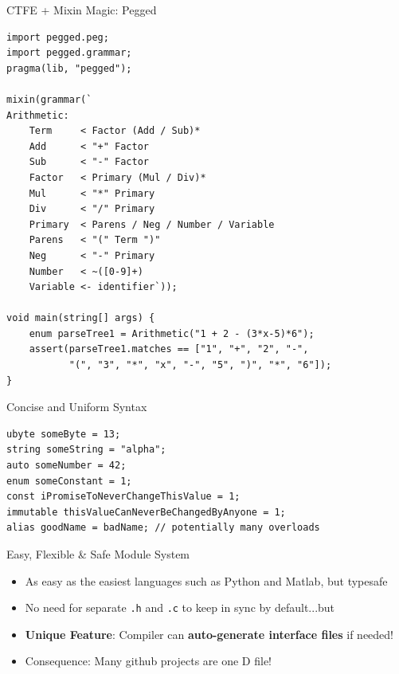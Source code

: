 \documentclass[xcolor=dvipsnames]{beamer}
\begin{document}
\begin{frame}[fragile]{CTFE + Mixin Magic: Pegged}
\footnotesize
\begin{lstlisting}[frame=single]
import pegged.peg;
import pegged.grammar;
pragma(lib, "pegged");

mixin(grammar(`
Arithmetic:
    Term     < Factor (Add / Sub)*
    Add      < "+" Factor
    Sub      < "-" Factor
    Factor   < Primary (Mul / Div)*
    Mul      < "*" Primary
    Div      < "/" Primary
    Primary  < Parens / Neg / Number / Variable
    Parens   < "(" Term ")"
    Neg      < "-" Primary
    Number   < ~([0-9]+)
    Variable <- identifier`));

void main(string[] args) {
    enum parseTree1 = Arithmetic("1 + 2 - (3*x-5)*6");
    assert(parseTree1.matches == ["1", "+", "2", "-",
           "(", "3", "*", "x", "-", "5", ")", "*", "6"]);
}
\end{lstlisting}
\end{frame}

\begin{frame}[fragile]{Concise and Uniform Syntax}
\begin{lstlisting}[frame=single]
ubyte someByte = 13;
string someString = "alpha";
auto someNumber = 42;
enum someConstant = 1;
const iPromiseToNeverChangeThisValue = 1;
immutable thisValueCanNeverBeChangedByAnyone = 1;
alias goodName = badName; // potentially many overloads
\end{lstlisting}
\end{frame}

\begin{frame}[fragile]{Easy, Flexible \& Safe Module System}
  \begin{itemize}[<+->]
  \item As easy as the easiest languages such as Python and Matlab, but typesafe
  \item No need for separate \texttt{.h} and \texttt{.c} to keep in sync by
    default...but
  \item \textbf{Unique Feature}: Compiler can \textbf{auto-generate interface
      files} if needed!
  \item Consequence: Many github projects are one D file!
  \end{itemize}
\end{frame}
\end{document}

